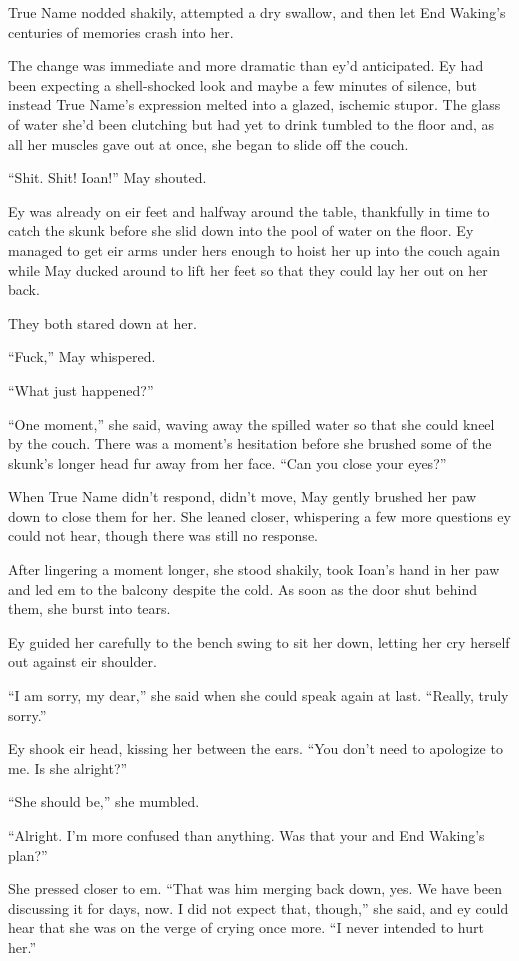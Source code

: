 True Name nodded shakily, attempted a dry swallow, and then let End Waking's centuries of memories crash into her.

The change was immediate and more dramatic than ey'd anticipated. Ey had been expecting a shell-shocked look and maybe a few minutes of silence, but instead True Name's expression melted into a glazed, ischemic stupor. The glass of water she'd been clutching but had yet to drink tumbled to the floor and, as all her muscles gave out at once, she began to slide off the couch.

``Shit. Shit! Ioan!'' May shouted.

Ey was already on eir feet and halfway around the table, thankfully in time to catch the skunk before she slid down into the pool of water on the floor. Ey managed to get eir arms under hers enough to hoist her up into the couch again while May ducked around to lift her feet so that they could lay her out on her back.

They both stared down at her.

``Fuck,'' May whispered.

``What just happened?''

``One moment,'' she said, waving away the spilled water so that she could kneel by the couch. There was a moment's hesitation before she brushed some of the skunk's longer head fur away from her face. ``Can you close your eyes?''

When True Name didn't respond, didn't move, May gently brushed her paw down to close them for her. She leaned closer, whispering a few more questions ey could not hear, though there was still no response.

After lingering a moment longer, she stood shakily, took Ioan's hand in her paw and led em to the balcony despite the cold. As soon as the door shut behind them, she burst into tears.

Ey guided her carefully to the bench swing to sit her down, letting her cry herself out against eir shoulder.

``I am sorry, my dear,'' she said when she could speak again at last. ``Really, truly sorry.''

Ey shook eir head, kissing her between the ears. ``You don't need to apologize to me. Is she alright?''

``She should be,'' she mumbled.

``Alright. I'm more confused than anything. Was that your and End Waking's plan?''

She pressed closer to em. ``That was him merging back down, yes. We have been discussing it for days, now. I did not expect that, though,'' she said, and ey could hear that she was on the verge of crying once more. ``I never intended to hurt her.''

